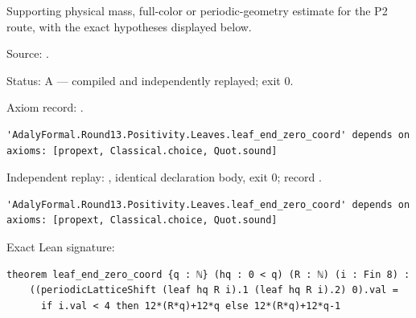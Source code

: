 \begin{theorem}[bp-441]
\label{bp-441}
\leanok
Supporting physical mass, full-color or periodic-geometry estimate for the P2 route, with the exact hypotheses displayed below.

\par Source: \texttt{}.
\par Status: A — compiled and independently replayed; exit 0.
\par Axiom record: \texttt{}.
\begin{verbatim}
'AdalyFormal.Round13.Positivity.Leaves.leaf_end_zero_coord' depends on axioms: [propext, Classical.choice, Quot.sound]
\end{verbatim}
\par Independent replay: \texttt{}, identical declaration body, exit 0; record \texttt{}.
\begin{verbatim}
'AdalyFormal.Round13.Positivity.Leaves.leaf_end_zero_coord' depends on axioms: [propext, Classical.choice, Quot.sound]
\end{verbatim}
\par Exact Lean signature:
\begin{verbatim}
theorem leaf_end_zero_coord {q : ℕ} (hq : 0 < q) (R : ℕ) (i : Fin 8) :
    ((periodicLatticeShift (leaf hq R i).1 (leaf hq R i).2) 0).val =
      if i.val < 4 then 12*(R*q)+12*q else 12*(R*q)+12*q-1
\end{verbatim}
\end{theorem}


